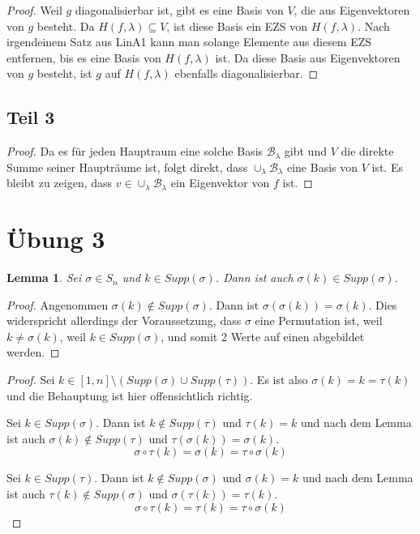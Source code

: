 \documentclass[10pt,a4paper]{article}
\begin{document}
\begin{proof}
Weil $g$ diagonalisierbar ist, gibt es eine Basis von $V$, die aus Eigenvektoren von $g$ besteht.
Da $H(f, \lambda) \subseteq V$, ist diese Basis ein EZS von $H(f, \lambda)$.
Nach irgendeinem Satz aus LinA1 kann man solange Elemente aus diesem EZS entfernen, bis es eine Basis von $H(f, \lambda)$ ist.
Da diese Basis aus Eigenvektoren von $g$ besteht, ist $g$ auf $H(f, \lambda)$ ebenfalls diagonalisierbar.
\end{proof}

\subsection*{Teil 3}

\begin{proof}
Da es für jeden Hauptraum eine solche Basis $\mathcal{B}_{\lambda}$ gibt und $V$ die direkte Summe seiner Haupträume ist, folgt direkt, dass $\cup_{\lambda} \mathcal{B}_{\lambda}$ eine Basis von $V$ ist.
Es bleibt zu zeigen, dass $v \in \cup_{\lambda} \mathcal{B}_{\lambda}$ ein Eigenvektor von $f$ ist.
\end{proof}

\section*{Übung 3}

\newtheorem*{lemma}{Lemma}

\begin{lemma}
Sei $\sigma \in S_{n}$ und $k \in Supp(\sigma)$.
Dann ist auch $\sigma(k) \in Supp(\sigma)$.
\end{lemma}

\begin{proof}
Angenommen $\sigma(k) \notin Supp(\sigma)$.
Dann ist $\sigma(\sigma(k)) = \sigma(k)$.
Dies widerspricht allerdings der Voraussetzung, dass $\sigma$ eine Permutation ist, weil $k \ne \sigma(k)$, weil $k \in Supp(\sigma)$, und somit 2 Werte auf einen abgebildet werden.
\end{proof}

\begin{proof}
Sei $k \in [1, n] \setminus (Supp(\sigma) \cup Supp(\tau))$.
Es ist also $\sigma(k) = k = \tau(k)$ und die Behauptung ist hier offensichtlich richtig.

Sei $k \in Supp(\sigma)$.
Dann ist $k \notin Supp(\tau)$ und $\tau(k) = k$ und nach dem Lemma ist auch $\sigma(k) \notin Supp(\tau)$ und $\tau(\sigma(k)) = \sigma(k)$.
\begin{equation}
\sigma \circ \tau(k) = \sigma(k) = \tau \circ \sigma(k)
\end{equation}

Sei $k \in Supp(\tau)$.
Dann ist $k \notin Supp(\sigma)$ und $\sigma(k) = k$ und nach dem Lemma ist auch $\tau(k) \notin Supp(\sigma)$ und $\sigma(\tau(k)) = \tau(k)$.
\begin{equation}
\sigma \circ \tau(k) = \tau(k) = \tau \circ \sigma(k)
\end{equation}
\end{proof}
\end{document}
